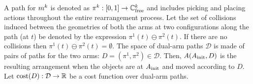 A path for $m^k$ is denoted as $ \pi^k : [0,1] \rightarrow \mathbb{C}_{{\rm free}}^k$ and includes picking and placing actions throughout the entire rearrangement process. Let the set of collisions induced between the geometries of both the arms at two configurations along the path (at $t$) be denoted by the expression $ \pi^1(t) \ominus \pi^2(t) $. If there are no collisions then $\pi^1(t) \ominus \pi^2(t) = \emptyset$.
The space of dual-arm paths $\mathcal{D}$ is made of pairs of paths for the two arms: $D = (\pi^1,\pi^2) \in \mathcal{D}$. Then, $A(A_{\rm init}, D)$ is the resulting arrangement when the objects are at $A_{\rm init}$ and moved according to $D$.   Let $ \textup{cost}(D) : \mathcal{D} \rightarrow \mathbb{R} $ be a cost function over dual-arm paths. 

